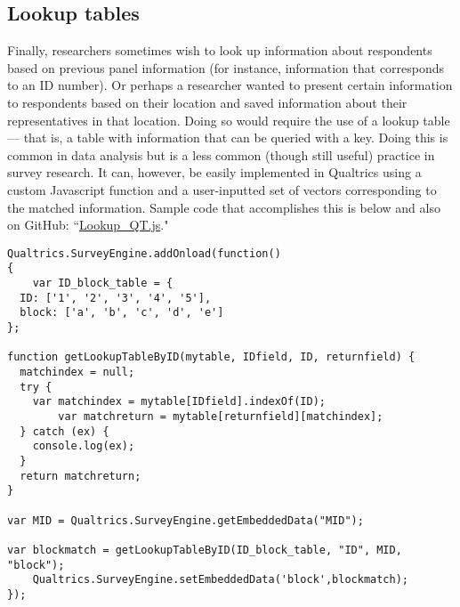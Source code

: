 \documentclass[12pt]{article}
\begin{document}
\subsection{Lookup tables}
Finally, researchers sometimes wish to look up information about respondents based on previous panel information (for instance, information that corresponds to an ID number). Or perhaps a researcher wanted to present certain information to respondents based on their location and saved information about their representatives in that location. Doing so would require the use of a lookup table --- that is, a table with information that can be queried with a key. Doing this is common in data analysis but is a less common (though still useful) practice in survey research. It can, however, be easily implemented in Qualtrics using a custom Javascript function and a user-inputted set of vectors corresponding to the matched information. Sample code that accomplishes this is below and also on GitHub: ``\href{https://github.com/justindbk/qualtrics-javascript}{Lookup\_QT.js}."

\begin{verbatim}
Qualtrics.SurveyEngine.addOnload(function()
{
	var ID_block_table = {
  ID: ['1', '2', '3', '4', '5'],
  block: ['a', 'b', 'c', 'd', 'e']
};

function getLookupTableByID(mytable, IDfield, ID, returnfield) {
  matchindex = null;
  try {
    var matchindex = mytable[IDfield].indexOf(ID);
		var matchreturn = mytable[returnfield][matchindex];
  } catch (ex) {
    console.log(ex);
  }
  return matchreturn;
}

var MID = Qualtrics.SurveyEngine.getEmbeddedData("MID");

var blockmatch = getLookupTableByID(ID_block_table, "ID", MID, "block");
	Qualtrics.SurveyEngine.setEmbeddedData('block',blockmatch);
});\end{verbatim}



\end{document}
